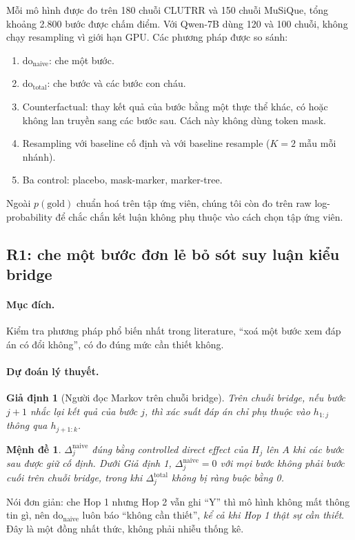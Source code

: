 \documentclass[11pt]{article}
\newtheorem{menhde}{Mệnh đề}
\newtheorem{giadinh}{Giả định}
\newcommand{\dn}{\mathrm{do}_{\text{naive}}}
\newcommand{\dt}{\mathrm{do}_{\text{total}}}
\begin{document}
Mỗi mô hình được đo trên 180 chuỗi CLUTRR và 150 chuỗi MuSiQue, tổng khoảng 2.800 bước được chấm
điểm. Với Qwen-7B dùng 120 và 100 chuỗi, không chạy resampling vì giới hạn GPU. Các phương pháp
được so sánh:
\begin{enumerate}[leftmargin=*,itemsep=1pt]
\item $\dn$: che một bước.
\item $\dt$: che bước và các bước con cháu.
\item Counterfactual: thay kết quả của bước bằng một thực thể khác, có hoặc không lan truyền sang
  các bước sau. Cách này không dùng token mask.
\item Resampling với baseline cố định và với baseline resample ($K=2$ mẫu mỗi nhánh).
\item Ba control: placebo, mask-marker, marker-tree.
\end{enumerate}
Ngoài $p(\text{gold})$ chuẩn hoá trên tập ứng viên, chúng tôi còn đo trên raw log-probability để
chắc chắn kết luận không phụ thuộc vào cách chọn tập ứng viên.

\subsection{R1: che một bước đơn lẻ bỏ sót suy luận kiểu bridge}

\paragraph{Mục đích.} Kiểm tra phương pháp phổ biến nhất trong literature, ``xoá một bước xem đáp
án có đổi không'', có đo đúng mức cần thiết không.

\paragraph{Dự đoán lý thuyết.}
\begin{giadinh}[Người đọc Markov trên chuỗi bridge]
Trên chuỗi bridge, nếu bước $j+1$ nhắc lại kết quả của bước $j$, thì xác suất đáp án chỉ phụ thuộc
vào $h_{1:j}$ thông qua $h_{j+1:k}$.
\end{giadinh}
\begin{menhde}
$\Delta^{\text{naive}}_j$ đúng bằng \emph{controlled direct effect} của $H_j$ lên $A$ khi các bước
sau được giữ cố định. Dưới Giả định 1, $\Delta^{\text{naive}}_j=0$ với mọi bước không phải bước
cuối trên chuỗi bridge, trong khi $\Delta^{\text{total}}_j$ không bị ràng buộc bằng 0.
\end{menhde}
Nói đơn giản: che Hop 1 nhưng Hop 2 vẫn ghi ``Y'' thì mô hình không mất thông tin gì, nên $\dn$
luôn báo ``không cần thiết'', \emph{kể cả khi Hop 1 thật sự cần thiết}. Đây là một đồng nhất thức,
không phải nhiễu thống kê.
\end{document}
